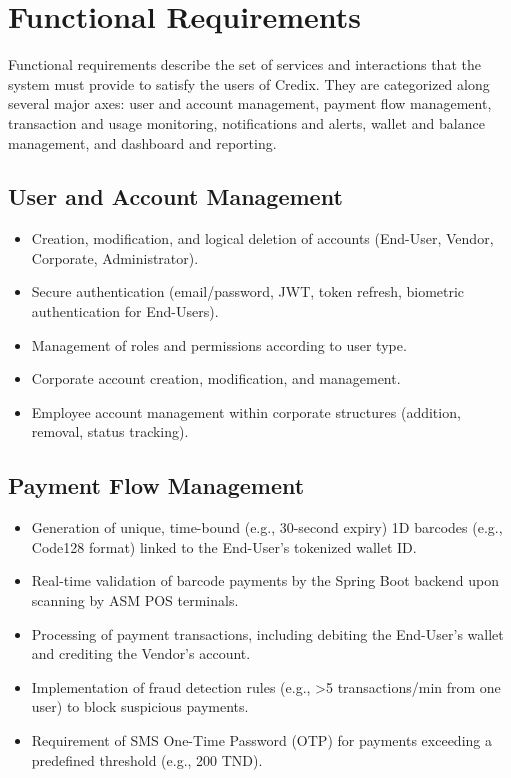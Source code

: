 \section{Functional Requirements}

Functional requirements describe the set of services and interactions that the system must provide to satisfy the users of Credix. They are categorized along several major axes: user and account management, payment flow management, transaction and usage monitoring, notifications and alerts, wallet and balance management, and dashboard and reporting.

\subsection{User and Account Management}
\begin{itemize}
    \item Creation, modification, and logical deletion of accounts (End-User, Vendor, Corporate, Administrator).
    \item Secure authentication (email/password, JWT, token refresh, biometric authentication for End-Users).
    \item Management of roles and permissions according to user type.
    \item Corporate account creation, modification, and management.
    \item Employee account management within corporate structures (addition, removal, status tracking).
\end{itemize}

\subsection{Payment Flow Management}
\begin{itemize}
    \item Generation of unique, time-bound (e.g., 30-second expiry) 1D barcodes (e.g., Code128 format) linked to the End-User's tokenized wallet ID.
    \item Real-time validation of barcode payments by the Spring Boot backend upon scanning by ASM POS terminals.
    \item Processing of payment transactions, including debiting the End-User's wallet and crediting the Vendor's account.
    \item Implementation of fraud detection rules (e.g., >5 transactions/min from one user) to block suspicious payments.
    \item Requirement of SMS One-Time Password (OTP) for payments exceeding a predefined threshold (e.g., 200 TND).
\end{itemize}

